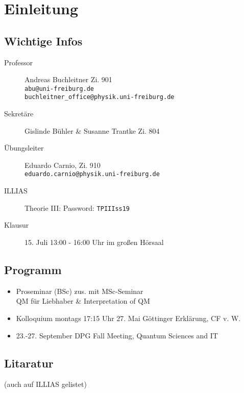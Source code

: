 
\setcounter{chapter}{-1}

\chapter{Einleitung}

\section{Wichtige Infos}

\begin{description}
	\item[Professor] Andreas Buchleitner  Zi. 901\\
	\verb|abu@uni-freiburg.de| \\
	\verb|buchleitner_office@physik.uni-freiburg.de|
	\item[Sekretäre] Gislinde Bühler \& Susanne Trantke Zi. 804
	\item[Übungsleiter] Eduardo Carnio, Zi. 910\\
	 \verb|eduardo.carnio@physik.uni-freiburg.de|
	\item[ILLIAS] Theorie III:  Password: \texttt{TPIIIss19}
	\item[Klausur] 15. Juli 13:00 - 16:00 Uhr im großen Hörsaal
\end{description}

\section{Programm}

\begin{itemize}
	\item Proseminar (BSc) zus. mit MSc-Seminar\\
	QM für Liebhaber \& Interpretation of QM
	\item Kolloquium montags 17:15 Uhr 27. Mai Göttinger Erklärung, CF v. W.
	\item 23.-27. September DPG Fall Meeting, Quantum Sciences and IT
\end{itemize}

\section{Litaratur}

(auch auf ILLIAS gelistet)

